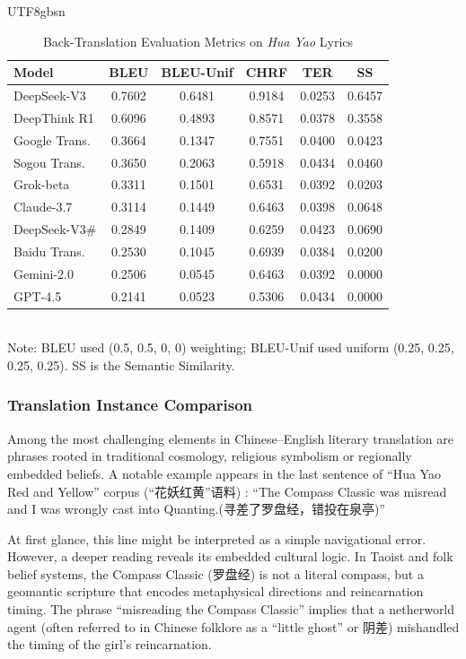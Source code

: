 \documentclass[conference]{IEEEtran}
\begin{document}
\begin{CJK}{UTF8}{gbsn}
\begin{table}[h!]%
\centering
\caption{Back-Translation Evaluation Metrics on \textit{Hua Yao} Lyrics}
\begin{tabular}{l|c|c|c|c|c}
\hline
\textbf{Model} & \textbf{BLEU} & \textbf{BLEU-Unif} & \textbf{CHRF} & \textbf{TER} & \textbf{SS} \\
\hline
DeepSeek-V3    & 0.7602 & 0.6481 & 0.9184 & 0.0253 & 0.6457 \\
DeepThink R1   & 0.6096 & 0.4893 & 0.8571 & 0.0378 & 0.3558 \\
Google Trans.   & 0.3664 & 0.1347 & 0.7551 & 0.0400 & 0.0423 \\
Sogou Trans.    & 0.3650 & 0.2063 & 0.5918 & 0.0434 & 0.0460 \\
Grok-beta       & 0.3311 & 0.1501 & 0.6531 & 0.0392 & 0.0203 \\
Claude-3.7      & 0.3114 & 0.1449 & 0.6463 & 0.0398 & 0.0648 \\
DeepSeek-V3\#   & 0.2849 & 0.1409 & 0.6259 & 0.0423 & 0.0690 \\
Baidu Trans.    & 0.2530 & 0.1045 & 0.6939 & 0.0384 & 0.0200 \\
Gemini-2.0      & 0.2506 & 0.0545 & 0.6463 & 0.0392 & 0.0000 \\
GPT-4.5         & 0.2141 & 0.0523 & 0.5306 & 0.0434 & 0.0000 \\
\hline
\end{tabular}
\label{tab:flower-backtranslation}
\\
\footnotesize{Note: BLEU used (0.5, 0.5, 0, 0) weighting; BLEU-Unif used uniform (0.25, 0.25, 0.25, 0.25). SS is the Semantic Similarity.}
\end{table}

\subsubsection{Translation Instance Comparison} 
Among the most challenging elements in Chinese–English literary translation are phrases rooted in traditional cosmology, religious symbolism or regionally embedded beliefs. A notable example appears in the last sentence of ``Hua Yao Red and Yellow'' corpus (``花妖红黄''语料) : ``The Compass Classic was misread and I was wrongly cast into Quanting.(寻差了罗盘经，错投在泉亭)''

At first glance, this line might be interpreted as a simple navigational error. However, a deeper reading reveals its embedded cultural logic. In Taoist and folk belief systems, the Compass Classic (罗盘经) is not a literal compass, but a geomantic scripture that encodes metaphysical directions and reincarnation timing. The phrase ``misreading the Compass Classic'' implies that a netherworld agent (often referred to in Chinese folklore as a ``little ghost'' or 阴差) mishandled the timing of the girl’s reincarnation.


\end{CJK}
\end{document}
